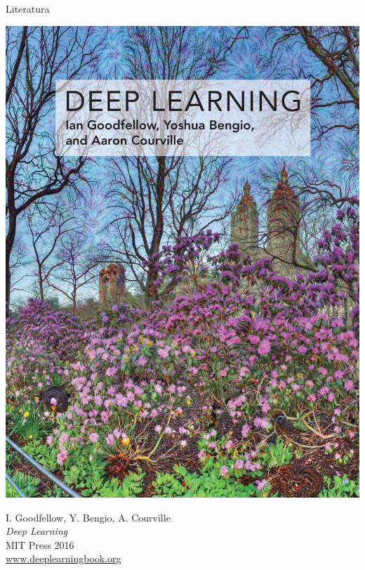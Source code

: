 \documentclass{sa}
\begin{document}
\begin{frame}{Literatura}
\begin{minipage}{.5\textwidth}
\includegraphics[width=\textwidth]{dl-book.jpg}
\end{minipage}
\begin{minipage}{.49\textwidth}
{\small I. Goodfellow, Y. Bengio, A. Courville}\\
\emph{Deep Learning}\\
MIT Press 2016 \\
\url{www.deeplearningbook.org}
\end{minipage}
\end{frame}
\end{document}
